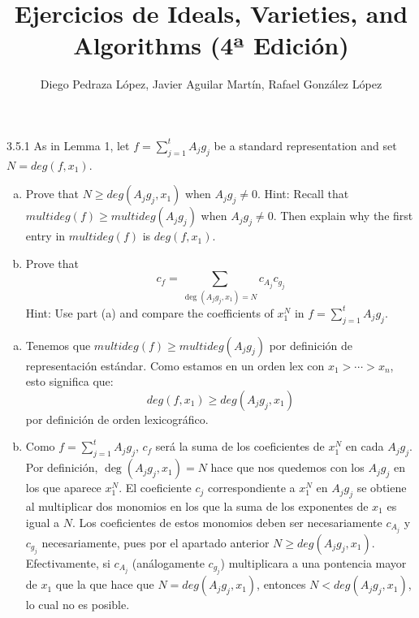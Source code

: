 \documentclass[twoside]{article}
\begin{document}
\title{Ejercicios de Ideals, Varieties, and Algorithms (4ª Edición)}
\author{Diego Pedraza López, Javier Aguilar Martín, Rafael González López}
\maketitle

\begin{ejercicio}{3.5.1}
As in Lemma 1, let $f = \sum_{j=1}^t A_j g_j$ be a standard representation and set $N = deg(f,x_1)$.
\begin{enumerate}[a.]
\item Prove that $N \geq deg(A_j g_j, x_1)$ when $A_j g_j \neq 0$.
Hint: Recall that $multideg(f) \geq multideg(A_j g_j)$ when $A_j g_j \neq 0$.
Then explain why the first entry in $multideg(f)$ is $deg(f,x_1)$.
\item Prove that
\[ c_f = \sum_{\deg(A_j g_j, x_1) = N} c_{A_j}c_{g_j} \]
Hint: Use part (a) and compare the coefficients of $x_1^N$ in $f = \sum_{j=1}^t A_j g_j$.
\end{enumerate}
\end{ejercicio}
\begin{solucion}\mbox{}
\begin{enumerate}[(a)]
\item Tenemos que $multideg(f) \geq multideg(A_j g_j)$ por definición de representación estándar. Como estamos en un orden lex con $x_1 > \cdots > x_n$, esto significa que:
\[deg(f,x_1) \geq deg(A_j g_j, x_1) \]
por definición de orden lexicográfico.
\item Como $f = \sum_{j=1}^t A_j g_j$, $c_f$ será la suma de los coeficientes de $x_1^N$ en cada $ A_j g_j$. Por definición, $\deg(A_j g_j, x_1) = N$ hace que nos quedemos con los $A_jg_j$ en los que aparece $x_1^N$. El coeficiente $c_j$ correspondiente a $x_1^N$ en $A_jg_j$ se obtiene al multiplicar dos monomios en los que la suma de los exponentes de $x_1$ es igual a $N$. Los coeficientes de estos monomios deben ser necesariamente $c_{A_j}$ y $c_{g_j}$ necesariamente, pues por el apartado anterior $N \geq deg(A_j g_j, x_1)$. Efectivamente, si $c_{A_j}$ (análogamente $c_{g_j}$) multiplicara a una pontencia mayor de $x_1$ que la que hace que $N = deg(A_j g_j, x_1)$, entonces  $N < deg(A_j g_j, x_1)$, lo cual no es posible. 
\end{enumerate}
\end{solucion}

\newpage
\end{document}
